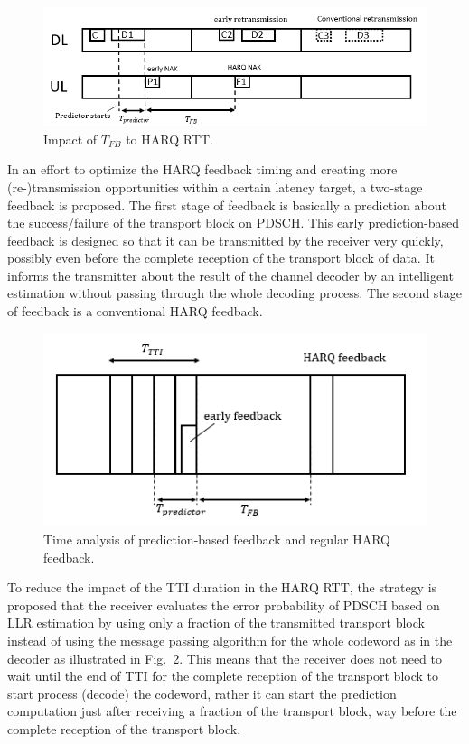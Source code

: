 \documentclass[conference]{IEEEtran}
\begin{document}
\begin{figure}[htbp]
\centerline{\includegraphics[scale=0.35]{fig1.png}}
\caption{Impact of $T_{FB}$ to HARQ RTT.}
\label{fig1}
\end{figure}

In an effort to optimize the HARQ feedback timing and creating more (re-)transmission opportunities within a certain latency target, a two-stage feedback is proposed. The first stage of feedback is basically a prediction about the success/failure of the transport block on PDSCH. This early prediction-based feedback is designed so that it can be transmitted by the receiver very quickly, possibly even before the complete reception of the transport block of data. It informs the transmitter about the result of the channel decoder by an intelligent estimation without passing through the whole decoding process. The second stage of feedback is a conventional HARQ feedback.

\begin{figure}[htbp]
\centerline{\includegraphics[scale=0.4]{fig2.png}}
\caption{Time analysis of prediction-based feedback and regular HARQ feedback.}
\label{fig2}
\end{figure}

To reduce the impact of the TTI duration in the HARQ RTT, the strategy is proposed that the receiver evaluates the error probability of PDSCH based on LLR estimation by using only a fraction of the transmitted transport block instead of using the message passing algorithm for the whole codeword as in the decoder as illustrated in Fig.~\ref{fig2}. This means that the receiver does not need to wait until the end of TTI for the complete reception of the transport block to start process (decode) the codeword, rather it can start the prediction computation just after receiving a fraction of the transport block, way before the complete reception of the transport block.
\end{document}

